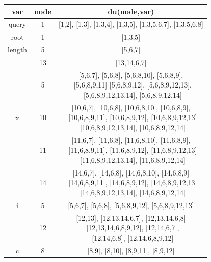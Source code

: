 \documentclass[12pt]{article}
\begin{document}
\begin{table}[htb]
\centering
\begin{tabular}{| c | c | c |} 
 \hline
 \textbf{var} & \textbf{node} & \textbf{du(node,var)} \\ \hline
 query        & 1 & [1,2], [1,3], [1,3,4], [1,3,5], [1,3,5,6,7], [1,3,5,6,8] \\ \hline
 root         & 1 & [1,3,5] \\ \hline
 length       & 5 & [5,6,7] \\ \cline{2-3}
	          & 13 & [13,14,6,7] \\ \hline
            & 5 & \makecell{[5,6,7], [5,6,8], [5,6,8,10], [5,6,8,9], \\\ [5,6,8,9,11]  [5,6,8,9,12], [5,6,8,9,12,13],\\\ [5,6,8,9,12,13,14], [5,6,8,9,12,14]} \\ \cline{2-3}
x            & 10 & \makecell{[10,6,7], [10,6,8], [10,6,8,10], [10,6,8,9], \\\ [10,6,8,9,11], [10,6,8,9,12], [10,6,8,9,12,13] \\\ [10,6,8,9,12,13,14], [10,6,8,9,12,14]} \\ \cline{2-3}
            & 11 & \makecell{[11,6,7], [11,6,8], [11,6,8,10], [11,6,8,9], \\\ [11,6,8,9,11], [11,6,8,9,12], [11,6,8,9,12,13] \\\ [11,6,8,9,12,13,14], [11,6,8,9,12,14]} \\ \cline{2-3}
             & 14 & \makecell{[14,6,7], [14,6,8], [14,6,8,10], [14,6,8,9] \\\ [14,6,8,9,11], [14,6,8,9,12], [14,6,8,9,12,13] \\\ [14,6,8,9,12,13,14], [14,6,8,9,12,14]} \\ \hline
 i            & 5 & [5,6,7], [5,6,8], [5,6,8,9,12], [5,6,8,9,12,13] \\ \cline{2-3}
             & 12 & \makecell{[12,13], [12,13,14,6,7], [12,13,14,6,8] \\\ [12,13,14,6,8,9,12], [12,14,6,7], \\\ [12,14,6,8], [12,14,6,8,9,12]} \\ \hline
 c            & 8 & [8,9], [8,10], [8,9,11], [8,9,12] \\ \hline
\end{tabular}
\end{table}
\end{document}
